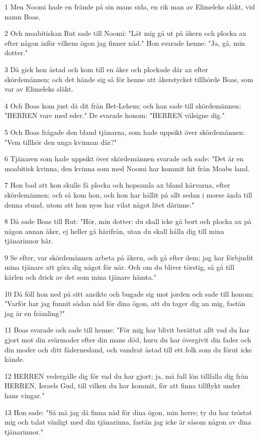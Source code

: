 \par 1 Men Noomi hade en frände på sin mans sida, en rik man av Elimeleks släkt, vid namn Boas.
\par 2 Och moabitiskan Rut sade till Noomi: "Låt mig gå ut på åkern och plocka ax efter någon inför vilkens ögon jag finner nåd." Hon svarade henne: "Ja, gå, min dotter."
\par 3 Då gick hon åstad och kom till en åker och plockade där ax efter skördemännen; och det hände sig så för henne att åkerstycket tillhörde Boas, som var av Elimeleks släkt.
\par 4 Och Boas kom just då dit från Bet-Lehem; och han sade till skördemännen: "HERREN vare med eder." De svarade honom: "HERREN välsigne dig."
\par 5 Och Boas frågade den bland tjänarna, som hade uppsikt över skördemännen: "Vem tillhör den unga kvinnan där?"
\par 6 Tjänaren som hade uppsikt över skördemännen svarade och sade: "Det är en moabitisk kvinna, den kvinna som med Noomi har kommit hit från Moabs land.
\par 7 Hon bad att hon skulle få plocka och hopsamla ax bland kärvarna, efter skördemännen; och så kom hon, och hon har hållit på allt sedan i morse ända till denna stund, utom att hon nyss har vilat något litet därinne."
\par 8 Då sade Boas till Rut: "Hör, min dotter: du skall icke gå bort och plocka ax på någon annan åker, ej heller gå härifrån, utan du skall hålla dig till mina tjänarinnor här.
\par 9 Se efter, var skördemännen arbeta på åkern, och gå efter dem; jag har förbjudit mina tjänare att göra dig något för när. Och om du bliver törstig, så gå till kärlen och drick av det som mina tjänare hämta."
\par 10 Då föll hon ned på sitt ansikte och bugade sig mot jorden och sade till honom: "Varför har jag funnit sådan nåd för dina ögon, att du tager dig an mig, fastän jag är en främling?"
\par 11 Boas svarade och sade till henne: "För mig har blivit berättat allt vad du har gjort mot din svärmoder efter din mans död, huru du har övergivit din fader och din moder och ditt fädernesland, och vandrat åstad till ett folk som du förut icke kände.
\par 12 HERREN vedergälle dig för vad du har gjort; ja, må full lön tillfalla dig från HERREN, Israels Gud, till vilken du har kommit, för att finna tillflykt under hans vingar."
\par 13 Hon sade: "Så må jag då finna nåd för dina ögon, min herre; ty du har tröstat mig och talat vänligt med din tjänarinna, fastän jag icke är såsom någon av dina tjänarinnor."

